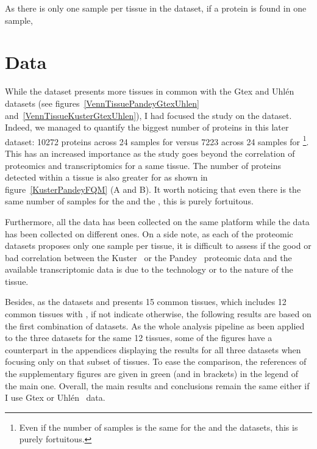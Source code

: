 As there is only one sample per tissue in the  dataset,
if a protein is found in one sample, 



\section{Data}\raggedbottom
\label{sec:IntegrationData}
While the  dataset presents more tissues in common
with the Gtex and Uhlén datasets (see figures~\ref{VennTissuePandeyGtexUhlen}
and~\ref{VennTissueKusterGtexUhlen}), I had focused the study on
the  dataset. Indeed, we managed to quantify the biggest number
of proteins in this later dataset: 10272 proteins across 24 samples for
 versus 7223 across 24 samples for \footnote{Even
if the number of samples is the same for the  and
the  datasets, this is purely fortuitous.}.
This has an increased importance as the study goes beyond the correlation of
proteomics and transcriptomics for a same tissue. The number of proteins
detected within a tissue is also greater for  as shown
in figure~\ref{KusterPandeyFQM} (A and B).
It worth noticing that even there is the same number of samples for the
 and the , this is purely fortuitous.

Furthermore, all the  data has been
collected on the same platform while the  data has been collected on
different ones. On a side note, as each of the proteomic datasets proposes
only one sample per tissue, it is difficult to assess if the good or bad
correlation between the Kuster \etal\ or the Pandey \etal\ proteomic data
and the available transcriptomic data is due to the technology or
to the nature of the tissue.

Besides, as the datasets  and  presents 15 common
tissues, which includes 12 common tissues with , if not
indicate otherwise, the following results are based on the first combination of
datasets. As the whole analysis pipeline as been applied to the three datasets for
the same 12 tissues, some of the figures have a counterpart in the
appendices displaying the results for all three datasets when focusing only on that
subset of tissues. To ease the comparison, the references of the supplementary
figures are given in green (and in brackets) in the legend of the main one.
Overall, the main results and conclusions remain the same either if I use Gtex or
Uhlén \etal\ data.


